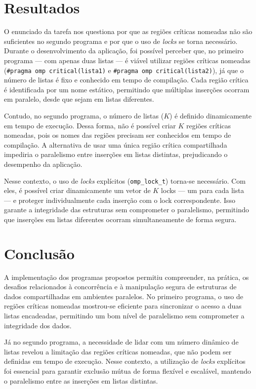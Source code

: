 \documentclass[a4paper, 12pt]{article}
\begin{document}
	\section{Resultados}
	\hspace{0.7cm}O enunciado da tarefa nos questiona por que as regiões críticas nomeadas não são suficientes no segundo programa e por que o uso de \textit{locks} se torna necessário. Durante o desenvolvimento da aplicação, foi possível perceber que, no primeiro programa — com apenas duas listas — é viável utilizar regiões críticas nomeadas (\texttt{\#pragma omp critical(lista1)} e \texttt{\#pragma omp critical(lista2)}), já que o número de listas é fixo e conhecido em tempo de compilação. Cada região crítica é identificada por um nome estático, permitindo que múltiplas inserções ocorram em paralelo, desde que sejam em listas diferentes.
	
	Contudo, no segundo programa, o número de listas ($K$) é definido dinamicamente em tempo de execução. Dessa forma, não é possível criar $K$ regiões críticas nomeadas, pois os nomes das regiões precisam ser conhecidos em tempo de compilação. A alternativa de usar uma única região crítica compartilhada impediria o paralelismo entre inserções em listas distintas, prejudicando o desempenho da aplicação.
	
	Nesse contexto, o uso de \textit{locks} explícitos (\texttt{omp\_lock\_t}) torna-se necessário. Com eles, é possível criar dinamicamente um vetor de $K$ locks — um para cada lista — e proteger individualmente cada inserção com o lock correspondente. Isso garante a integridade das estruturas sem comprometer o paralelismo, permitindo que inserções em listas diferentes ocorram simultaneamente de forma segura.

	
	\section{Conclusão}
	\hspace{0.7cm}A implementação dos programas propostos permitiu compreender, na prática, os desafios relacionados à concorrência e à manipulação segura de estruturas de dados compartilhadas em ambientes paralelos. No primeiro programa, o uso de regiões críticas nomeadas mostrou-se eficiente para sincronizar o acesso a duas listas encadeadas, permitindo um bom nível de paralelismo sem comprometer a integridade dos dados.
	
	Já no segundo programa, a necessidade de lidar com um número dinâmico de listas revelou a limitação das regiões críticas nomeadas, que não podem ser definidas em tempo de execução. Nesse contexto, a utilização de \textit{locks} explícitos foi essencial para garantir exclusão mútua de forma flexível e escalável, mantendo o paralelismo entre as inserções em listas distintas.
	
\end{document}
